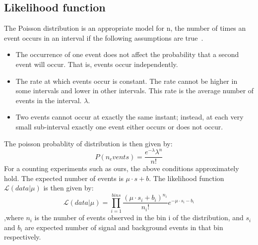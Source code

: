 \subsection{Likelihood function}
The Poisson distribution is an appropriate model for n, the number of times an event occurs in an interval if the following assumptions are true~\cite{poisson_wiki}.
\begin{itemize}
\item The occurrence of one event does not affect the probability that a second event will occur. That is, events occur independently.
\item The rate at which events occur is constant. The rate cannot be higher in some intervals and lower in other intervals. This rate is the average number of events in the interval. $\lambda$.
\item Two events cannot occur at exactly the same instant; instead, at each very small sub-interval exactly one event either occurs or does not occur.
\end{itemize}
The poisson probablity of distribution is then given by:
\begin{equation*}
  P(n_events)=\frac{e^{-\lambda}\lambda^{n}}{n!}
\end{equation*}
For a counting experiments such as ours, the above conditions approximately hold. The expected number of events is $\mu\cdot s + b$. The likelihood function $\mathcal{L}(data|\mu)$ is then given by:
\begin{equation*}
  \mathcal{L}(data|\mu)=\prod_{i=1}^{bins}\frac{(\mu\cdot s_i + b_i)^{n_i}}{n_{i}!}e^{-\mu\cdot s_i - b_i}
\end{equation*}
,where $n_i$ is the number of events observed in the bin i of the distribution, and $s_i$ and $b_i$ are expected number of signal and background events in that bin respectively.


